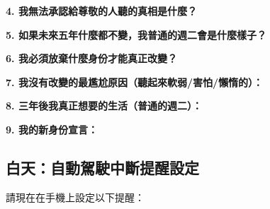 \documentclass[12pt,a4paper]{article}
\begin{document}
\textbf{4. 我無法承認給尊敬的人聽的真相是什麼？}
\begin{center}
\end{center}

\newpage

\textbf{5. 如果未來五年什麼都不變，我普通的週二會是什麼樣子？}
\begin{center}
\end{center}

\textbf{6. 我必須放棄什麼身份才能真正改變？}
\begin{center}
\end{center}

\textbf{7. 我沒有改變的最尷尬原因（聽起來軟弱/害怕/懶惰的）：}
\begin{center}
\end{center}

\textbf{8. 三年後我真正想要的生活（普通的週二）：}
\begin{center}
\end{center}

\textbf{9. 我的新身份宣言：}
\begin{center}
\end{center}

\newpage

\subsection{白天：自動駕駛中斷提醒設定}

請現在在手機上設定以下提醒：
\end{document}

